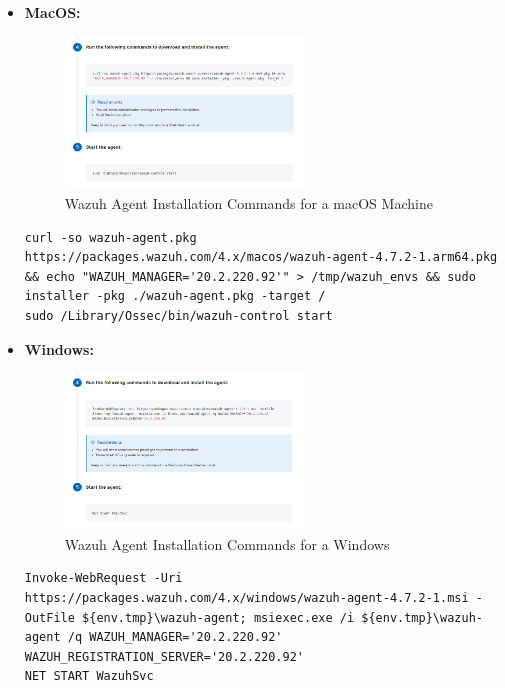 \begin{itemize}
\begin{itemize}
    \item \textbf{MacOS:}
    \begin{figure}[H]
      \centering
      \includegraphics[width=0.6\textwidth]{images/wazuh-agent-commands-mac.png}
      \caption{Wazuh Agent Installation Commands for a macOS Machine}
    \end{figure}
    \begin{verbatim}
curl -so wazuh-agent.pkg https://packages.wazuh.com/4.x/macos/wazuh-agent-4.7.2-1.arm64.pkg && echo "WAZUH_MANAGER='20.2.220.92'" > /tmp/wazuh_envs && sudo installer -pkg ./wazuh-agent.pkg -target /
sudo /Library/Ossec/bin/wazuh-control start
    \end{verbatim}

    \item \textbf{Windows:}
    \begin{figure}[H]
      \centering
      \includegraphics[width=0.6\textwidth]{images/wazuh-agent-commands-win.png}
      \caption{Wazuh Agent Installation Commands for a Windows}
    \end{figure}
    \begin{verbatim}
Invoke-WebRequest -Uri https://packages.wazuh.com/4.x/windows/wazuh-agent-4.7.2-1.msi -OutFile ${env.tmp}\wazuh-agent; msiexec.exe /i ${env.tmp}\wazuh-agent /q WAZUH_MANAGER='20.2.220.92' WAZUH_REGISTRATION_SERVER='20.2.220.92' 
NET START WazuhSvc
    \end{verbatim}
\end{itemize}

  \end{itemize}
